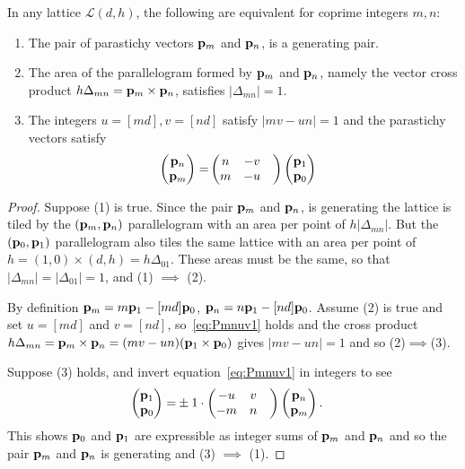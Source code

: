 \begin{theorem}
\label{thm:gLattice}
\label{thm:glattice}
	In any lattice $\mathcal{L}(d,h)$, the following are equivalent for coprime integers $m,n$:
	\begin{enumerate}
			\item The pair of parastichy vectors ${\mathbf p}_{m}$ and ${\mathbf p}_{n}$, is a generating pair.
\item The area of the parallelogram formed by ${\mathbf p}_{m}$ and ${\mathbf p}_{n}$, namely the vector cross product $h\Delta_{mn}={\mathbf p}_{m}\times{\mathbf p}_{n}$, satisfies
$|\Delta_{mn}|=1$. 	
		\item The integers $u=[md],v=[nd]$ satisfy $|mv-un|=1$ and the parastichy vectors	
		 satisfy 
	\begin{align}\label{eq:Pmnuv1}
			\begin{pmatrix}
			{\mathbf p}_{n} \\ {\mathbf p}_{m} 
		\end{pmatrix} = &
		\begin{pmatrix}
		n & - v 
		\\
		m &- u &
			\end{pmatrix}
		\begin{pmatrix}
			{\mathbf p}_{1}
			\\
			{\mathbf p}_{0}
		\end{pmatrix}
	\end{align}
	\end{enumerate}
\end{theorem}
\begin{proof}
	Suppose (1) is true. Since the pair  ${\mathbf p}_{m}$ and ${\mathbf p}_{n}$, is generating the lattice is tiled
	by the $({\mathbf p}_{m},{\mathbf p}_{n})$ parallelogram with an area per point of $h|\Delta_{mn}|$. But  the $({\mathbf p}_{0},{\mathbf p}_{1})$ parallelogram also tiles the same lattice with an area per point of $h= (1,0)\times(d,h)=h\Delta_{01}$. These areas must be the same, so that $|\Delta_{mn}|=|\Delta_{01}|=1$, and (1) $\implies$ (2). 
	
By definition ${\mathbf p}_{m}=m{\mathbf p}_{1}- [md]{\mathbf p}_{0}$,  ${\mathbf p}_{n}=n{\mathbf p}_{1}-[nd]{\mathbf p}_{0}$. Assume (2) is true  and set $u=[md]$ and $v=[nd]$, so~\eqref{eq:Pmnuv1} holds 
		and the cross product $h\Delta_{mn}={\mathbf p}_{m}\times{\mathbf p}_{n}=(m v - u n) ({\mathbf p}_{1} \times {\mathbf p}_{0})$ gives $|m v-un|=1$ and so
	 (2)$\implies$(3). 

Suppose (3) holds, and invert equation~\eqref{eq:Pmnuv1} in integers to see
	\begin{align}	
		\label{eq:Pmnuv2}
		\begin{pmatrix}
			{\mathbf p}_{1}
			\\
			{\mathbf p}_{0}
		\end{pmatrix} = & \pm 1 \cdot
		\begin{pmatrix}
			-u &  v 
			\\
			-m & n &
		\end{pmatrix}
		\begin{pmatrix}
			{\mathbf p}_{n} \\ {\mathbf p}_{m} 
		\end{pmatrix}. 
	\end{align}
This shows  ${\mathbf p}_{0}$ and ${\mathbf p}_{1}$ are expressible as integer sums of ${\mathbf p}_{m}$ and ${\mathbf p}_{n}$ and so the pair  ${\mathbf p}_{m}$ and ${\mathbf p}_{n}$ is generating and (3) $\implies$ (1). 

\end{proof}
